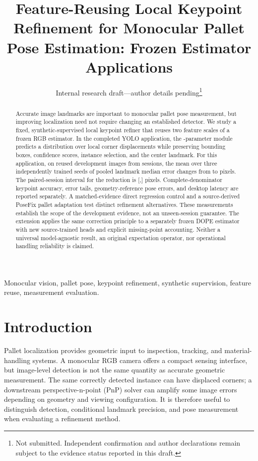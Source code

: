 \documentclass[journal]{IEEEtran}
\title{Feature-Reusing Local Keypoint Refinement for Monocular Pallet Pose Estimation: Frozen Estimator Applications}
\author{Internal research draft---author details pending\thanks{Not submitted. Independent confirmation and author declarations remain subject to the evidence status reported in this draft.}}
\begin{document}
\maketitle
\begin{abstract}
Accurate image landmarks are important to monocular pallet pose measurement, but improving localization need not require changing an established detector. We study a fixed, synthetic-supervised local keypoint refiner that reuses two feature scales of a frozen RGB estimator. In the completed YOLO application, the \Pparams{}-parameter module predicts a distribution over local corner displacements while preserving bounding boxes, confidence scores, instance selection, and the center landmark. For this application, on \DevN{} reused development images from \SessionN{} sessions, the mean over three independently trained seeds of pooled landmark median error changes from \Rmedian{} to \Pmedian{} pixels. The paired-session interval for the reduction is [\ImproveLow{},\ImproveHigh{}] pixels. Complete-denominator keypoint accuracy, error tails, geometry-reference pose errors, and desktop latency are reported separately. A matched-evidence direct regression control and a source-derived PoseFix pallet adaptation test distinct refinement alternatives. \PriorAbstract{} These measurements establish the scope of the development evidence, not an unseen-session guarantee. \ConfirmationAbstract{} The extension applies the same correction principle to a separately frozen DOPE estimator with new source-trained heads and explicit missing-point accounting. \DopeAbstractStatus{} \ResnetAbstractStatus{} Neither a universal model-agnostic result, an original expectation operator, nor operational handling reliability is claimed.
\end{abstract}
\begin{IEEEkeywords}
Monocular vision, pallet pose, keypoint refinement, synthetic supervision, feature reuse, measurement evaluation.
\end{IEEEkeywords}

\section{Introduction}
Pallet localization provides geometric input to inspection, tracking, and material-handling systems. A monocular RGB camera offers a compact sensing interface, but image-level detection is not the same quantity as accurate geometric measurement. The same correctly detected instance can have displaced corners; a downstream perspective-n-point (PnP) solver can amplify some image errors depending on geometry and viewing configuration. It is therefore useful to distinguish detection, conditional landmark precision, and pose measurement when evaluating a refinement method.
\end{document}
